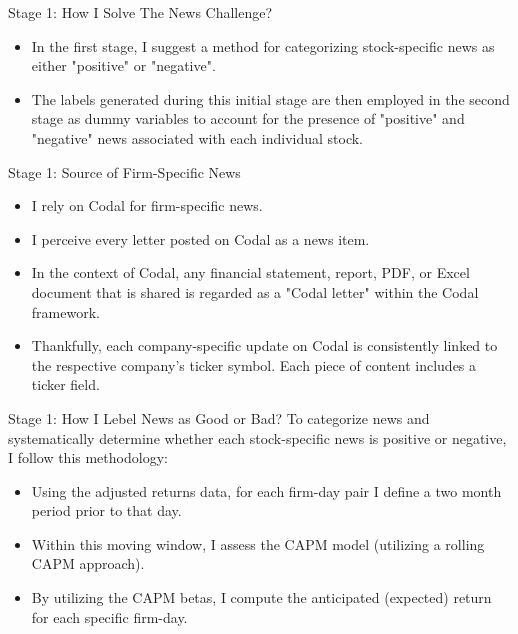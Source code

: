 \documentclass{beamer}
\begin{document}
\begin{frame}{Stage 1: How I Solve The News Challenge?}

    \begin{itemize}
        \item In the first stage, I suggest a method for categorizing stock-specific news as either "positive" or "negative".
        \item The labels generated during this initial stage are then employed in the second stage as dummy variables to account for the presence of "positive" and "negative" news associated with each individual stock.
    \end{itemize}

\end{frame}


\begin{frame}{Stage 1: Source of Firm-Specific News}

    \begin{itemize}
        \item I rely on Codal for firm-specific news.
        \item I perceive every letter posted on Codal as a news item.
        \item In the context of Codal, any financial statement, report, PDF, or Excel document that is shared is regarded as a "Codal letter" within the Codal framework.
        \item Thankfully, each company-specific update on Codal is consistently linked to the respective company's ticker symbol. Each piece of content includes a ticker field.
    \end{itemize}

\end{frame}


\begin{frame}{Stage 1: How I Lebel News as Good or Bad?}
    To categorize news and systematically determine whether each stock-specific news is positive or negative, I follow this methodology:
    \begin{itemize}
        \item Using the adjusted returns data, for each firm-day pair I define a two month period prior to that day.
        \item Within this moving window, I assess the CAPM model (utilizing a rolling CAPM approach).
        \item By utilizing the CAPM betas, I compute the anticipated (expected) return for each specific firm-day.
    \end{itemize}

\end{frame}
\end{document}
